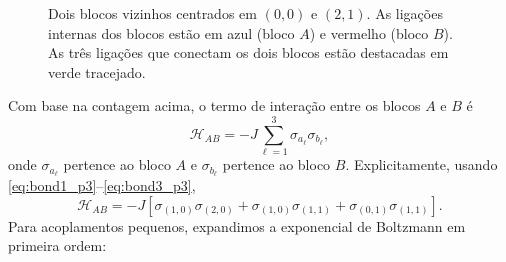 \documentclass[12pt,a4paper]{article}
\begin{document}
\begin{figure}[H]
    \centering
    \caption{Dois blocos vizinhos centrados em \((0,0)\) e \((2,1)\).
    As ligações internas dos blocos estão em azul (bloco \(A\)) e
    vermelho (bloco \(B\)). As três ligações que conectam os dois
    blocos estão destacadas em verde tracejado.}
    \label{fig:blocos_p3}
\end{figure}
%
Com base na contagem acima, o termo de interação entre os blocos
\(A\) e \(B\) é
%
\begin{equation}
    \mathcal H_{AB}
    =
    -J
    \sum_{\ell=1}^{3}
    \sigma_{a_\ell}\sigma_{b_\ell},
    \label{eq:HAB_p3}
\end{equation}
%
onde \(\sigma_{a_\ell}\) pertence ao bloco \(A\) e
\(\sigma_{b_\ell}\) pertence ao bloco \(B\). Explicitamente, usando
\eqref{eq:bond1_p3}--\eqref{eq:bond3_p3},
%
\begin{equation}
    \mathcal H_{AB}
    =
    -J
    \left[
        \sigma_{(1,0)}\sigma_{(2,0)}
        +
        \sigma_{(1,0)}\sigma_{(1,1)}
        +
        \sigma_{(0,1)}\sigma_{(1,1)}
    \right].
\end{equation}
%
Para acoplamentos pequenos, expandimos a exponencial de Boltzmann em
primeira ordem:
\end{document}
